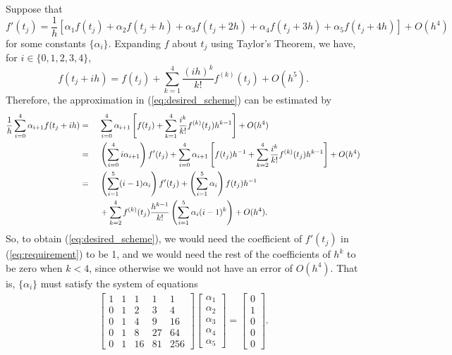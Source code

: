\documentclass{homework}
\begin{document}
	\question Suppose that
	\begin{equation}
		\label{eq:desired_scheme}
		f'(t_j) = \frac{1}{h}\left[\alpha_1f(t_j) + \alpha_2f(t_j+h) + \alpha_3f(t_j+2h) + \alpha_4f(t_j +3h) + \alpha_5f(t_j + 4h)\right] + O(h^4)
	\end{equation}
	for some constants $\{\alpha_i\}$. Expanding $f$ about $t_j$ using Taylor's Theorem, we have, for $i \in \{0,1,2,3,4\}$,
	\begin{equation}
		f(t_j+ih) = f(t_j) + \sum_{k=1}^4 \frac{(ih)^k}{k!}f^{(k)}(t_j) + O(h^5).
	\end{equation}
	Therefore, the approximation in (\ref{eq:desired_scheme}) can be estimated by
	\begin{alignat}{2}
		\frac{1}{h}\sum_{i=0}^{4}\alpha_{i+1}f(t_j + ih) &{}={}& & \sum_{i=0}^4\alpha_{i+1}\left[f(t_j) + \sum_{k=1}^4 \frac{i^k}{k!}f^{(k)}(t_j)h^{k-1}\right] + O(h^4) \\
		&{}={}& &\left(\sum_{i=0}^4i\alpha_{i+1}\right)f'(t_j) + \sum_{i=0}^4 \alpha_{i+1}\left[f(t_j)h^{-1} + \sum_{k=2}^4\frac{i^k}{k!}f^{(k)}(t_j)h^{k-1}\right] + O(h^4) \\
		\label{eq:requirement}
		&{}={}& &\left(\sum_{i=1}^5(i-1)\alpha_i\right)f'(t_j) + \left(\sum_{i=1}^5\alpha_i\right)f(t_j)h^{-1} \\ \notag
		&&&{}+ \sum_{k=2}^4f^{(k)}(t_j)\frac{h^{k-1}}{k!}\left(\sum_{i=1}^5\alpha_i(i-1)^k\right) + O(h^4).
	\end{alignat}
	So, to obtain (\ref{eq:desired_scheme}), we would need the coefficient of $f'(t_j)$ in (\ref{eq:requirement}) to be 1, and we would need the rest of the coefficients of $h^{k}$ to be zero when $k < 4$, since otherwise we would not have an error of $O(h^4)$. That is, $\{\alpha_i\}$ must satisfy the system of equations
	\begin{align}
		\left[\begin{matrix}
			1 & 1 & 1 & 1 & 1 \\
			0 & 1 & 2 & 3 & 4 \\
			0 & 1 & 4 & 9 & 16 \\
			0 & 1 & 8 & 27 & 64 \\
			0 & 1 & 16 & 81 & 256
		\end{matrix}\right]
		\left[\begin{matrix}
			\alpha_1 \\ \alpha_2 \\ \alpha_3 \\ \alpha_4 \\ \alpha_5
		\end{matrix}\right] =
		\left[\begin{matrix}
			0 \\ 1 \\ 0 \\ 0 \\ 0
		\end{matrix}\right].
	\end{align}
\end{document}
